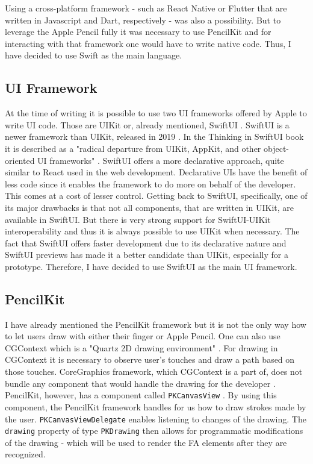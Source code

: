 Using a cross-platform framework - such as React Native \cite{react-native} or Flutter \cite{flutter} that are written in Javascript and Dart, respectively - was also a possibility. But to leverage the Apple Pencil fully it was necessary to use PencilKit \cite{pencilkit} and for interacting with that framework one would have to write native code. Thus, I have decided to use Swift as the main language.

\subsection{UI Framework}

At the time of writing it is possible to use two UI frameworks offered by Apple to write UI code. Those are UIKit \cite{uikit} or, already mentioned, SwiftUI \cite{swiftui}. SwiftUI is a newer framework than UIKit, released in 2019 \cite{swiftui-release}. In the Thinking in SwiftUI book it is described as a "radical departure from UIKit, AppKit, and other object-oriented UI frameworks" \cite{thinking-in-swiftui}. SwiftUI offers a more declarative approach, quite similar to React \cite{react} used in the web development. Declarative UIs have the benefit of less code since it enables the framework to do more on behalf of the developer. This comes at a cost of lesser control. Getting back to SwiftUI, specifically, one of its major drawbacks is that not all components, that are written in UIKit, are available in SwiftUI. But there is very strong support for SwiftUI-UIKit interoperability \cite{swiftui-interop} and thus it is always possible to use UIKit when necessary. The fact that SwiftUI offers faster development due to its declarative nature and SwiftUI previews \cite{swiftui-preview} has made it a better candidate than UIKit, especially for a prototype. Therefore, I have decided to use SwiftUI as the main UI framework.

\subsection{PencilKit}

I have already mentioned the PencilKit framework but it is not the only way how to let users draw with either their finger or Apple Pencil. One can also use CGContext which is a "Quartz 2D drawing environment" \cite{cgcontext}. For drawing in CGContext it is necessary to observe user's touches and draw a path based on those touches. CoreGraphics framework, which CGContext is a part of, does not bundle any component that would handle the drawing for the developer \cite{coregraphics}. PencilKit, however, has a component called \lstinline{PKCanvasView} \cite{pkcanvasview}. By using this component, the PencilKit framework handles for us how to draw strokes made by the user. \lstinline{PKCanvasViewDelegate} enables listening to changes of the drawing. The \lstinline{drawing} property of type \lstinline{PKDrawing} then allows for programmatic modifications of the drawing - which will be used to render the FA elements after they are recognized.

